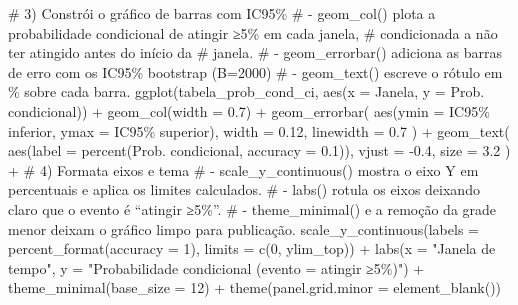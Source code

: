 \documentclass[
]{article}
\newenvironment{Shaded}{\begin{snugshade}}{\end{snugshade}}
\newcommand{\AttributeTok}[1]{\textcolor[rgb]{0.40,0.45,0.13}{#1}}
\newcommand{\CommentTok}[1]{\textcolor[rgb]{0.37,0.37,0.37}{#1}}
\newcommand{\DecValTok}[1]{\textcolor[rgb]{0.68,0.00,0.00}{#1}}
\newcommand{\FloatTok}[1]{\textcolor[rgb]{0.68,0.00,0.00}{#1}}
\newcommand{\FunctionTok}[1]{\textcolor[rgb]{0.28,0.35,0.67}{#1}}
\newcommand{\NormalTok}[1]{\textcolor[rgb]{0.00,0.23,0.31}{#1}}
\newcommand{\SpecialCharTok}[1]{\textcolor[rgb]{0.37,0.37,0.37}{#1}}
\newcommand{\StringTok}[1]{\textcolor[rgb]{0.13,0.47,0.30}{#1}}
\begin{document}
\begin{Shaded}
\begin{Highlighting}[]
\CommentTok{\# 3) Constrói o gráfico de barras com IC95\%  }
\CommentTok{\# {-} \textasciigrave{}geom\_col()\textasciigrave{} plota a probabilidade condicional de atingir ≥5\% em cada janela, }
\CommentTok{\#    condicionada a não ter atingido antes do início da \# janela.  }
\CommentTok{\# {-} \textasciigrave{}geom\_errorbar()\textasciigrave{} adiciona as barras de erro com os IC95\% bootstrap (B=2000)  }
\CommentTok{\# {-} \textasciigrave{}geom\_text()\textasciigrave{} escreve o rótulo em \% sobre cada barra.}
\FunctionTok{ggplot}\NormalTok{(tabela\_prob\_cond\_ci, }\FunctionTok{aes}\NormalTok{(}\AttributeTok{x =}\NormalTok{ Janela, }\AttributeTok{y =} \StringTok{\textasciigrave{}}\AttributeTok{Prob. condicional}\StringTok{\textasciigrave{}}\NormalTok{)) }\SpecialCharTok{+}
  \FunctionTok{geom\_col}\NormalTok{(}\AttributeTok{width =} \FloatTok{0.7}\NormalTok{) }\SpecialCharTok{+}
  \FunctionTok{geom\_errorbar}\NormalTok{(}
    \FunctionTok{aes}\NormalTok{(}\AttributeTok{ymin =} \StringTok{\textasciigrave{}}\AttributeTok{IC95\% inferior}\StringTok{\textasciigrave{}}\NormalTok{, }\AttributeTok{ymax =} \StringTok{\textasciigrave{}}\AttributeTok{IC95\% superior}\StringTok{\textasciigrave{}}\NormalTok{),}
    \AttributeTok{width =} \FloatTok{0.12}\NormalTok{, }\AttributeTok{linewidth =} \FloatTok{0.7}
\NormalTok{  ) }\SpecialCharTok{+}
  \FunctionTok{geom\_text}\NormalTok{(}
    \FunctionTok{aes}\NormalTok{(}\AttributeTok{label =} \FunctionTok{percent}\NormalTok{(}\StringTok{\textasciigrave{}}\AttributeTok{Prob. condicional}\StringTok{\textasciigrave{}}\NormalTok{, }\AttributeTok{accuracy =} \FloatTok{0.1}\NormalTok{)),}
    \AttributeTok{vjust =} \SpecialCharTok{{-}}\FloatTok{0.4}\NormalTok{, }\AttributeTok{size =} \FloatTok{3.2}
\NormalTok{  ) }\SpecialCharTok{+}
\CommentTok{\# 4) Formata eixos e tema  }
\CommentTok{\# {-} \textasciigrave{}scale\_y\_continuous()\textasciigrave{} mostra o eixo Y em percentuais e aplica os limites calculados.  }
\CommentTok{\# {-} \textasciigrave{}labs()\textasciigrave{} rotula os eixos deixando claro que o evento é “atingir ≥5\%”.  }
\CommentTok{\# {-} \textasciigrave{}theme\_minimal()\textasciigrave{} e a remoção da grade menor deixam o gráfico limpo para publicação.}
  \FunctionTok{scale\_y\_continuous}\NormalTok{(}\AttributeTok{labels =} \FunctionTok{percent\_format}\NormalTok{(}\AttributeTok{accuracy =} \DecValTok{1}\NormalTok{), }\AttributeTok{limits =} \FunctionTok{c}\NormalTok{(}\DecValTok{0}\NormalTok{, ylim\_top)) }\SpecialCharTok{+}
  \FunctionTok{labs}\NormalTok{(}\AttributeTok{x =} \StringTok{"Janela de tempo"}\NormalTok{, }\AttributeTok{y =} \StringTok{"Probabilidade condicional (evento = atingir ≥5\%)"}\NormalTok{) }\SpecialCharTok{+}
  \FunctionTok{theme\_minimal}\NormalTok{(}\AttributeTok{base\_size =} \DecValTok{12}\NormalTok{) }\SpecialCharTok{+}
  \FunctionTok{theme}\NormalTok{(}\AttributeTok{panel.grid.minor =} \FunctionTok{element\_blank}\NormalTok{())}
\end{Highlighting}
\end{Shaded}
\end{document}
